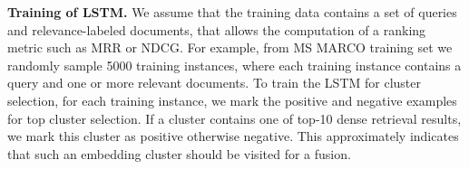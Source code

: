 {}



{\bf Training of LSTM.} 
We assume that the training data  contains
a set of queries and relevance-labeled documents,  that allows the computation of a ranking metric such as MRR or NDCG.
For example, from MS MARCO training set we randomly sample 5000 training instances, where each training instance contains a query and  one or more  relevant documents. 
To train the LSTM for cluster selection, 
for each training instance, we mark the positive and negative examples for  top cluster selection.
If a cluster contains one of top-10 dense retrieval results, we mark this cluster as positive otherwise negative.
This approximately indicates that such an embedding cluster should be visited for a fusion.

